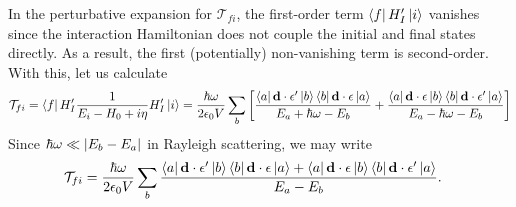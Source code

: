 \documentclass{article}
\theoremstyle{definition}
\newcommand{\f}[2]{\frac{#1}{#2}}
\newcommand{\lb}{\left[}
\newcommand{\rb}{\right]}
\begin{document}
\begin{enumerate}[label=(\alph*)]
In the perturbative expansion for $\mathcal{T}_{fi}$, the first-order term $\bra{f} H_I' \ket{i}$ vanishes since the interaction Hamiltonian does not couple the initial and final states directly. As a result, the first (potentially) non-vanishing term is second-order. With this, let us calculate 
\begin{align*}
\mathcal{T}_{fi} 
= \bra{f}  H_I'   \f{1}{ E_i - H_0 + i\eta}  H_I'   \ket{i}  
= \f{\hbar \omega}{2\epsilon_0 V} \sum_b \lb   
\f{\bra{a} \mathbf{d} \cdot \mathbf{\epsilon'} \ket{b} \bra{b} \mathbf{d} \cdot \mathbf{\epsilon} \ket{a}}{ E_a + \hbar \omega - E_b} 
+ 
\f{ \bra{a} \mathbf{d} \cdot \mathbf{\epsilon}    \ket{b} \bra{b} \mathbf{d} \cdot \mathbf{\epsilon'}    \ket{a}  }{E_a - \hbar \omega - E_b}  \rb
\end{align*} 
Since $\hbar \omega \ll \abs{E_b - E_a}$ in Rayleigh scattering, we may write
\begin{align*}
\mathcal{T}_{fi} 
&= \f{\hbar \omega}{2\epsilon_0 V} \sum_b    
\f{\bra{a} \mathbf{d} \cdot \mathbf{\epsilon'} \ket{b} \bra{b} \mathbf{d} \cdot \mathbf{\epsilon} \ket{a} + 
\bra{a} \mathbf{d} \cdot \mathbf{\epsilon}    \ket{b} \bra{b} \mathbf{d} \cdot \mathbf{\epsilon'}    \ket{a} }{ E_a - E_b}.
\end{align*}





\end{enumerate}
\end{document}
